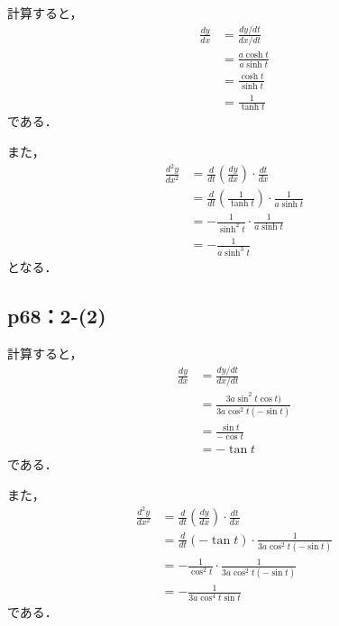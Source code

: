 \documentclass[uplatex,dvipdfmx,a4paper,10pt,fleqn]{jsarticle}
\newenvironment{tleftbar}{\begin{tbleftline}\setlength{\parindent}{1zw}}{\end{tbleftline}}
\begin{document}
\begin{tleftbar}
    計算すると，
    \begin{align*} 
        \frac{dy}{dx} & = \frac{ dy / dt}{dx /dt} \\
        & = \frac{a\cosh t}{a \sinh t} \\
        & = \frac{\cosh t}{\sinh t} \\
        & =\frac{1}{\tanh t}
    \end{align*} 
    である．

    また，
    \begin{align*} 
        \frac{d^2 y}{d x^2} & = \frac{d}{dt} \left (\frac{dy}{dx} \right ) \cdot  \frac{dt}{dx} \\
        & = \frac{d}{dt} \left ( \frac{1}{\tanh t} \right)\cdot \frac{1}{a\sinh t} \\
        & = -\frac{1}{\sinh^2 t} \cdot \frac{1}{a \sinh t} \\
        & = -\frac{1}{a\sinh ^3t}
    \end{align*} 
    となる．
\end{tleftbar}

\subsection*{p68：2-(2)}

\begin{tleftbar}
    計算すると，
    \begin{align*} 
        \frac{dy}{dx} & = \frac{ dy / dt}{dx /dt} \\
        & = \frac{ 3a \sin ^2 t \cos t)}{3a \cos ^2 t (-\sin t)} \\
        & =\frac{\sin t}{-\cos  t} \\
        & =-\tan t
    \end{align*} 
    である．

    また，
    \begin{align*} 
        \frac{d^2 y}{d x^2} & = \frac{d}{dt} \left (\frac{dy}{dx} \right ) \cdot  \frac{dt}{dx} \\
        & = \frac{d}{dt} ( -\tan t)\cdot \frac{1}{3a \cos ^2 t (-\sin t)} \\
        & = -\frac{1}{\cos ^2 t }\cdot \frac{1}{3a \cos ^2 t (-\sin t)} \\
        & = -\frac{1}{3a \cos ^4 t \sin t}
    \end{align*} 
    である．
\end{tleftbar}
\end{document}
